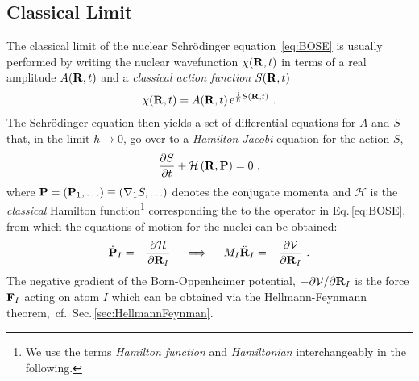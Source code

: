 \subsection{Classical Limit}
The classical limit of the nuclear Schr\"odinger equation~\eqref{eq:BOSE} is usually performed by writing the nuclear wavefunction $\chi ({\bf R}, t)$ in terms of a real amplitude $A({\bf R}, t)$ and a \emph{classical action function} $S({\bf R}, t)$~\cite{Dirac1981,Landau2013,Marx2009}
\begin{align}
\chi({\bf R}, t) = A({\bf R}, t) \, {\rm e}^{\frac{\im}{\hbar} S({\bf R}, t)}~.
\label{eq:class.1}
\end{align}
The Schr\"odinger equation then yields a set of differential equations for $A$ and $S$ that, in the limit $\hbar \to 0$, go over to a \emph{Hamilton-Jacobi} equation for the action $S$,
\begin{align}
\frac{\partial S}{\partial t} + \mathcal H \left({\bf R}, {\bf P}\right)
= 0~,
\label{eq:HamiltonJacobi}
\end{align}
where ${\bf P} = ({\bf P}_1, \ldots) \equiv ({\bf \nabla}_1 S, \ldots)$ denotes the conjugate momenta and $\mathcal H$ is the \emph{classical} Hamilton function\footnote{We use the terms \emph{Hamilton function} and \emph{Hamiltonian} interchangeably in the following.} corresponding the to the operator in Eq.\,\eqref{eq:BOSE}, from which the equations of motion for the nuclei can be obtained:
\begin{align}
\dot{{\bf P}}_I 
= -\frac{\partial \mathcal H}{\partial {\bf R}_I}
\quad\implies\quad M_I \ddot{\bf R}_I
= -\frac{\partial \mathcal V}{\partial {\bf R}_I}~.
\end{align}
The negative gradient of the Born-Oppenheimer potential, 
$-\partial \mathcal V / \partial {\bf R}_I$ is the force ${\bf F}_I$ acting on atom $I$ which can be obtained via the Hellmann-Feynmann theorem,~cf.~Sec.\,\ref{sec:HellmannFeynman}.

